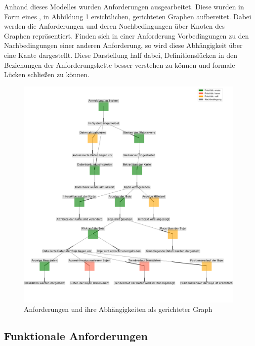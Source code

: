     Anhand dieses Modelles  wurden Anforderungen ausgearbeitet. Diese wurden in Form eines , in Abbildung \ref{fig:graph_anforderungen} ersichtlichen, gerichteten Graphen aufbereitet. Dabei werden die Anforderungen und deren Nachbedingungen über Knoten des Graphen repräsentiert. Finden sich in einer Anforderung Vorbedingungen zu den Nachbedingungen einer anderen Anforderung, so wird diese Abhängigkeit über eine Kante dargestellt. Diese Darstellung half dabei, Definitionslücken in den Beziehungen  der Anforderungskette besser verstehen zu können und formale Lücken schließen zu können.
      
    \begin{figure}[h!]
    \centering
    \includegraphics[width=\textwidth]{pix/graph_anforderungen.png}
    \caption{Anforderungen und ihre Abhängigkeiten als gerichteter Graph}
    \label{fig:graph_anforderungen}
    \end{figure}
    
     
    \subsection{Funktionale Anforderungen} 
    
